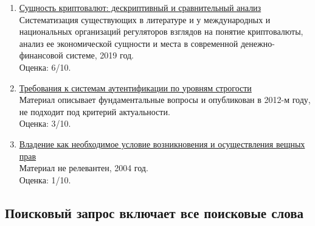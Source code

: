 \documentclass[a4paper, 12pt]{report}		%
\begin{document}
\begin{enumerate}
\item \href{https://cyberleninka.ru/article/n/suschnost-kriptovalyut-deskriptivnyy-i-sravnitelnyy-analiz}{Сущность криптовалют: дескриптивный и сравнительный анализ}\\
Систематизация существующих в литературе и у международных и национальных организаций регуляторов взглядов на понятие криптовалюты, анализ ее экономической сущности и места в современной денежно-финансовой системе, 2019 год.\\
Оценка: 6/10.
\item \href{https://journal.altstu.ru/media/f/old2/pv2012_2_1/pdf/061sabanov.pdf}{Требования к системам аутентификации по уровням строгости}\\
Материал описывает фундаментальные вопросы и опубликован в 2012-м году, не подходит под критерий актуальности.\\
Оценка: 3/10.
\item \href{https://static.freereferats.ru/_avtoreferats/01002740942.pdf}{Владение как необходимое условие возникновения и осуществления вещных прав}\\
Материал не релевантен, 2004 год.\\
Оценка: 1/10.
\end{enumerate}

\subsection*{Поисковый запрос включает все поисковые слова}
\end{document}
